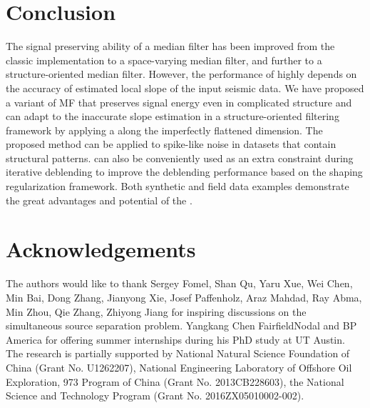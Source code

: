 \section{Conclusion}
The signal preserving ability of a median filter has been improved from the classic implementation to a space-varying median filter, and further to a structure-oriented median filter. However, the performance of  highly depends on the accuracy of estimated local slope of the input seismic data. We have proposed a variant of MF that preserves signal energy even in  complicated structure\wen{,} and can adapt to the inaccurate slope estimation in a structure-oriented filtering framework by applying a  along the imperfectly flattened dimension. The proposed method can be applied to  spike-like noise in datasets that contain structural patterns.   can also be conveniently used as an extra constraint during iterative deblending to improve the deblending performance based on the shaping regularization framework. Both synthetic and field data examples demonstrate the great advantages and potential of the .


\section{Acknowledgements}
The authors would like to thank Sergey Fomel, Shan Qu, Yaru Xue, Wei Chen, Min Bai, Dong Zhang, Jianyong Xie, Josef Paffenholz, Araz Mahdad, Ray Abma, Min Zhou, Qie Zhang,  Zhiyong Jiang for inspiring discussions on the simultaneous source separation problem. Yangkang Chen  FairfieldNodal and BP America for offering summer internships during his PhD study at UT Austin. %
 The research is partially supported by National Natural Science Foundation of China (Grant No. U1262207), National Engineering Laboratory of Offshore Oil Exploration, 973 Program of China (Grant No. 2013CB228603),  the National Science and Technology Program (Grant No. 2016ZX05010002-002).


